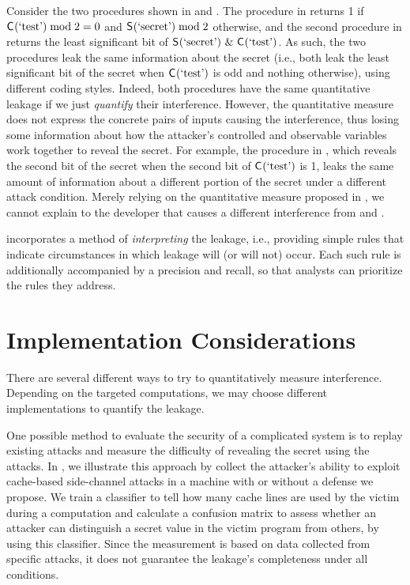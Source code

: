 Consider the two procedures shown in  and
. The procedure in  returns 1 if
$\mathsf{C}_{}(\textrm{`test'}) \bmod 2 = 0$ and $\mathsf{S}_{}(\textrm{`secret'}) \bmod 2$
otherwise, and the second procedure in  returns the least
significant bit of $\mathsf{S}_{}(\textrm{`secret'})~\&~\mathsf{C}_{}(\textrm{`test'})$.  As
such, the two procedures leak the same information about the secret (i.e., both
leak the least significant bit of the secret when $\mathsf{C}_{}(\textrm{`test'})$ is
odd and nothing otherwise), using different coding styles. Indeed,
both procedures have the same quantitative leakage if we just
\textit{quantify} their interference.  However, the quantitative
measure does not express the concrete pairs of inputs causing the
interference, thus losing some information about how the attacker's
controlled and observable variables work together to reveal the
secret. For example, the procedure in , which
reveals the second bit of the secret when the second bit of
$\mathsf{C}_{}(\textrm{`test'})$ is 1, leaks the same amount of information
about a different portion of the secret under a different attack condition. Merely relying on the
quantitative measure proposed in , we cannot
explain to the developer that  causes a
different interference from  and .

 incorporates a method of \textit{interpreting}
the leakage, i.e., providing simple rules that indicate circumstances
in which leakage will (or will not) occur.  Each such rule is
additionally accompanied by a precision and recall, so that analysts
can prioritize the rules they address.
 
\section{Implementation Considerations}
There are several different ways to try to quantitatively measure
interference. Depending on the targeted computations, we may choose
different implementations to quantify the leakage.

One possible method to evaluate the security of a complicated system
is to replay existing attacks and measure the difficulty of revealing
the secret using the attacks. In , we
illustrate this approach by collect the attacker's ability to exploit
cache-based side-channel attacks in a machine with or without a
defense we propose. We train a classifier to tell how many cache lines
are used by the victim during a computation and calculate a confusion
matrix to assess whether an attacker can distinguish a secret value in
the victim program from others, by using this classifier. Since the
measurement is based on data collected from specific attacks, it does
not guarantee the leakage's completeness under all conditions.

